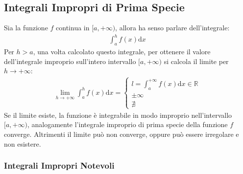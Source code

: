 \documentclass{article}
\numberwithin{equation}{subsection}
\begin{document}
\subsection{Integrali Impropri di Prima Specie}

Sia la funzione $f$ continua in $[a,+\infty)$, allora ha senso parlare dell'integrale:
\begin{gather*}
    \displaystyle\int_a^hf(x)\mathrm{d}x
\end{gather*}
Per $h>a$, una volta calcolato questo integrale, per ottenere il valore dell'integrale improprio sull'intero intervallo $[a,+\infty)$ si calcola il limite per $h\to+\infty$:
\begin{gather}
    \lim_{h\to+\infty}\displaystyle\int_a^hf(x)\mathrm{d}x=\begin{cases}
        l=\displaystyle\int_a^{+\infty}f(x)\mathrm{d}x\in\mathbb{R}\\
        \pm\infty\\
        \nexists
    \end{cases}
\end{gather}
Se il limite esiste, la funzione è integrabile in modo improprio nell'intervallo $[a,+\infty)$, analogamente l'integrale improprio di prima specie della funzione $f$ converge. Altrimenti il limite può non converge, oppure può essere irregolare e non esistere. 

\subsubsection{Integrali Impropri Notevoli}
\end{document}

